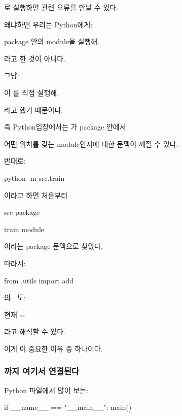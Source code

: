 로 실행하면 관련 오류를 만날 수 있다.

왜냐하면 우리는 Python에게:

\begin{dhksmry}[centered]
 package 안의  module을 실행해.
\end{dhksmry}

라고 한 것이 아니다.

그냥:

\begin{dhksmry}[centered]
이 를 직접 실행해.
\end{dhksmry}


라고 했기 때문이다.

즉 Python입장에서는 가 package 안에서

어떤 위치를 갖는 module인지에 대한 문맥이 깨질 수 있다.

반대로:

\begin{dhkzsh}
python -m src.train
\end{dhkzsh}

이라고 하면 처음부터

\begin{dhksmry}[centered]
src package

\da

train module
\end{dhksmry}

이라는 package 문맥으로 찾았다.

따라서:

\begin{dhkcode}
from .utils import add
\end{dhkcode}

의 . 도:

\begin{dhksmry}[centered]
현재  = 
\end{dhksmry}

라고 해석할 수 있다.

이게 이 중요한 이유 중 하나이다.

\subsubsection{까지 여기서 연결된다}

Python 파일에서 많이 보는:

\begin{dhkcode}
if __name__ == "__main__":
    main()
\end{dhkcode}

